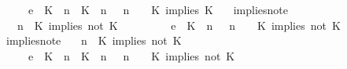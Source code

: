 \begin{isabellebody}
\ \ \ \ \ {\isasymhookrightarrow}\isactrlsub e\ \ {\isacharparenleft}{\isacharparenleft}{\isacharparenleft}K\ {\isasymUp}\ n{\isacharparenright}\ {\isacharhash}\ {\isacharparenleft}K\ {\isasymUp}\ n{\isacharparenright}\ {\isacharhash}\ {\isasymGamma}{\isacharparenright}{\isacharcomma}\ n\ {\isasymturnstile}\ {\isasymPsi}\ {\isasymtriangleright}\ {\isacharparenleft}{\isacharparenleft}K\ implies\ K\ {\isacharhash}\ {\isasymPhi}{\isacharparenright}{\isacharparenright}{\isacartoucheclose}\isanewline
{\isacharbar}\ implies{\isacharunderscore}not{\isacharunderscore}e{}{\isacharcolon}\isanewline
\ \ {\isacartoucheopen}{\isacharparenleft}{\isasymGamma}{\isacharcomma}\ n\ {\isasymturnstile}\ {\isacharparenleft}{\isacharparenleft}K\ implies\ not\ K\ {\isacharhash}\ {\isasymPsi}{\isacharparenright}\ {\isasymtriangleright}\ {\isasymPhi}{\isacharparenright}\isanewline
\ \ \ \ \ {\isasymhookrightarrow}\isactrlsub e\ \ {\isacharparenleft}{\isacharparenleft}{\isacharparenleft}K\ {\isasymnot}{\isasymUp}\ n{\isacharparenright}\ {\isacharhash}\ {\isasymGamma}{\isacharparenright}{\isacharcomma}\ n\ {\isasymturnstile}\ {\isasymPsi}\ {\isasymtriangleright}\ {\isacharparenleft}{\isacharparenleft}K\ implies\ not\ K\ {\isacharhash}\ {\isasymPhi}{\isacharparenright}{\isacharparenright}{\isacartoucheclose}\isanewline
{\isacharbar}\ implies{\isacharunderscore}not{\isacharunderscore}e{}{\isacharcolon}\isanewline
\ \ {\isacartoucheopen}{\isacharparenleft}{\isasymGamma}{\isacharcomma}\ n\ {\isasymturnstile}\ {\isacharparenleft}{\isacharparenleft}K\ implies\ not\ K\ {\isacharhash}\ {\isasymPsi}{\isacharparenright}\ {\isasymtriangleright}\ {\isasymPhi}{\isacharparenright}\isanewline
\ \ \ \ \ {\isasymhookrightarrow}\isactrlsub e\ \ {\isacharparenleft}{\isacharparenleft}{\isacharparenleft}K\ {\isasymUp}\ n{\isacharparenright}\ {\isacharhash}\ {\isacharparenleft}K\ {\isasymnot}{\isasymUp}\ n{\isacharparenright}\ {\isacharhash}\ {\isasymGamma}{\isacharparenright}{\isacharcomma}\ n\ {\isasymturnstile}\ {\isasymPsi}\ {\isasymtriangleright}\ {\isacharparenleft}{\isacharparenleft}K\ implies\ not\ K\ {\isacharhash}\ {\isasymPhi}{\isacharparenright}{\isacharparenright}{\isacartoucheclose}\isanewline

\end{isabellebody}
